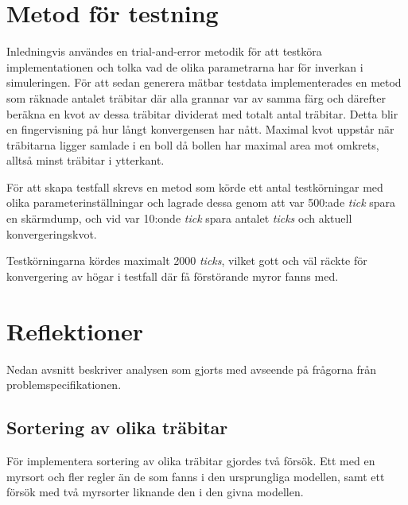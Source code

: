 \documentclass[titlepage, a4paper, 12pt]{article}
\begin{document}
\section{Metod för testning}\label{sec:metod-for-testning}

Inledningvis användes en trial-and-error metodik för att testköra
implementationen och tolka vad de olika parametrarna har för inverkan
i simuleringen. För att sedan generera mätbar testdata implementerades
en metod som räknade antalet träbitar där alla grannar var av samma
färg och därefter beräkna en kvot av dessa träbitar dividerat med
totalt antal träbitar. Detta blir en fingervisning på hur långt
konvergensen har nått. Maximal kvot uppstår när träbitarna ligger
samlade i en boll då bollen har maximal area mot omkrets, alltså minst
träbitar i ytterkant.

För att skapa testfall skrevs en metod som körde ett antal
testkörningar med olika parameterinställningar och lagrade dessa genom
att var 500:ade \textit{tick} spara en skärmdump, och vid var 10:onde
\textit{tick} spara antalet \textit{ticks} och aktuell
konvergeringskvot.

Testkörningarna kördes maximalt 2000 \textit{ticks}, vilket gott och
väl räckte för konvergering av högar i testfall där få förstörande
myror fanns med.


\section{Reflektioner}
Nedan avsnitt beskriver analysen som gjorts med avseende på frågorna
från problemspecifikationen.

\subsection{Sortering av olika träbitar}
För implementera sortering av olika träbitar gjordes två försök. Ett
med en myrsort och fler regler än de som fanns i den ursprungliga
modellen, samt ett försök med två myrsorter liknande den i den givna
modellen.
\end{document}
